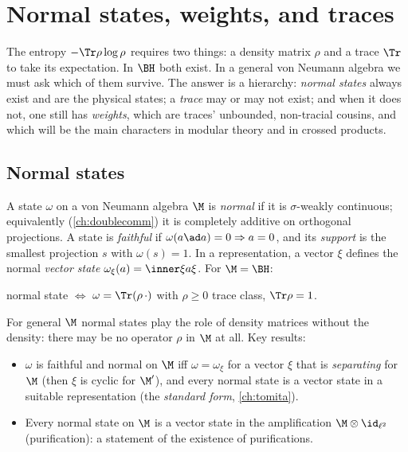 \chapter{Normal states, weights, and traces}\label{ch:traces}

\begin{physmotiv}
The entropy $-\Tr\rho\log\rho$ requires two things: a density matrix $\rho$ and a trace $\Tr$ to take its expectation. In $\BH$ both exist. In a general von Neumann algebra we must ask which of them survive. The answer is a hierarchy: \emph{normal states} always exist and are the physical states; a \emph{trace} may or may not exist; and when it does not, one still has \emph{weights}, which are traces' unbounded, non-tracial cousins, and which will be the main characters in modular theory and in crossed products.
\end{physmotiv}

\section{Normal states}

A state $\omega$ on a von Neumann algebra $\M$ is \emph{normal} if it is $\sigma$-weakly continuous; equivalently (\cref{ch:doublecomm}) it is completely additive on orthogonal projections. A state is \emph{faithful} if $\omega(a\ad a)=0\Rightarrow a=0$, and its \emph{support} is the smallest projection $s$ with $\omega(s)=1$. In a representation, a vector $\xi$ defines the normal \emph{vector state} $\omega_\xi(a)=\inner\xi{a\xi}$. For $\M=\BH$:
\begin{center}
normal state $\Longleftrightarrow$ $\omega=\Tr(\rho\,\cdot)$ with $\rho\ge0$ trace class, $\Tr\rho=1$.
\end{center}
For general $\M$ normal states play the role of density matrices without the density: there may be no operator $\rho$ in $\M$ at all. Key results:
\begin{itemize}
\item $\omega$ is faithful and normal on $\M$ iff $\omega=\omega_\xi$ for a vector $\xi$ that is \emph{separating} for $\M$ (then $\xi$ is cyclic for $\M'$), and every normal state is a vector state in a suitable representation (the \emph{standard form}, \cref{ch:tomita}).
\item Every normal state on $\M$ is a vector state in the amplification $\M\otimes\id_{\ell^2}$ (purification): a statement of the existence of purifications.
\end{itemize}

